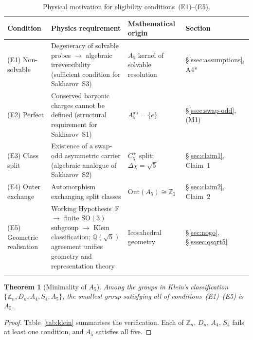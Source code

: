\documentclass[sn-mathphys-num,Numbered]{sn-jnl}
\theoremstyle{thmstyleone}
\newtheorem{theorem}{Theorem}[section]
\theoremstyle{thmstylethree}
\theoremstyle{thmstyletwo}
\newcommand{\SO}{\mathrm{SO}}
\newcommand{\Qsqrt}{\mathbb{Q}(\sqrt{5})}
\begin{document}
\begin{table}[h]
\caption{Physical motivation for eligibility conditions~(E1)--(E5).}
\label{tab:eligibility}
\begin{tabular}{@{}p{2cm}p{4cm}p{4cm}p{2.5cm}@{}}
\toprule
Condition & Physics requirement & Mathematical origin & Section \\
\midrule
(E1) Non-solvable &
  Degeneracy of solvable probes $\to$ algebraic irreversibility
  (sufficient condition for Sakharov~S3) &
  $A_5$ kernel of solvable resolution &
  \S\ref{ssec:assumptions}, A4* \\
(E2) Perfect &
  Conserved baryonic charges cannot be defined
  (structural requirement for Sakharov~S1) &
  $A_5^{\mathrm{ab}} = \{e\}$ &
  \S\ref{ssec:swap-odd}, (M1) \\
(E3) Class split &
  Existence of a swap-odd asymmetric carrier
  (algebraic analogue of Sakharov~S2) &
  $C_5^\pm$ split; $\Delta\chi = \sqrt{5}$ &
  \S\ref{sec:claim1}, Claim~1 \\
(E4) Outer exchange &
  Automorphism exchanging split classes &
  $\mathrm{Out}(A_5)\cong\mathbb{Z}_2$ &
  \S\ref{sec:claim2}, Claim~2 \\
(E5) Geometric realisation &
  Working Hypothesis~F $\to$ finite $\SO(3)$ subgroup $\to$
  Klein classification; $\Qsqrt$ agreement unifies geometry and
  representation theory &
  Icosahedral geometry &
  \S\ref{sec:nogo}, \S\ref{sssec:qsqrt5} \\
\botrule
\end{tabular}
\end{table}

\begin{theorem}[Minimality of $A_5$]
\label{thm:minimality}
Among the groups in Klein's classification
$\{\mathbb{Z}_n, D_n, A_4, S_4, A_5\}$, the smallest group satisfying
all of conditions~{\rm(E1)--(E5)} is $A_5$.
\end{theorem}

\begin{proof}
Table~\ref{tab:klein} summarises the verification.
Each of $\mathbb{Z}_n$, $D_n$, $A_4$, $S_4$ fails at least one
condition, and $A_5$ satisfies all five.
\end{proof}
\end{document}
